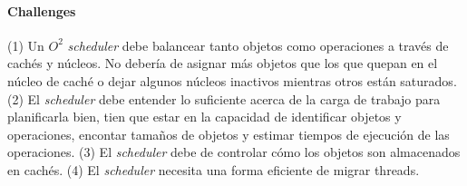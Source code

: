 \paragraph{\textnormal{\textbf{Challenges}}}
(1) Un $O^2$ \emph{scheduler} debe balancear tanto objetos como operaciones a través de cachés y núcleos. No debería de asignar más objetos que los que quepan en el núcleo de caché o dejar algunos núcleos inactivos mientras otros están saturados. (2) El \emph{scheduler} debe entender lo suficiente acerca de la carga de trabajo para planificarla bien, tien que estar en la capacidad de identificar objetos y operaciones, encontar tamaños de objetos y estimar tiempos de ejecución de las operaciones. (3) El \emph{scheduler} debe de controlar cómo los objetos son almacenados en cachés. (4) El \emph{scheduler} necesita una forma eficiente de migrar threads.

